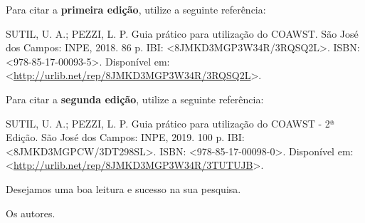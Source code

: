 \noindent Para citar a \textbf{primeira edição}, utilize a seguinte referência:
\bigskip

\noindent SUTIL, U. A.; PEZZI, L. P. Guia prático para utilização do COAWST. São José dos Campos: INPE, 2018. 86 p. IBI: <8JMKD3MGP3W34R/3RQSQ2L>. ISBN: <978-85-17-00093-5>. Disponível em: <\textcolor{bleu_cite}{\href{http://urlib.net/rep/8JMKD3MGP3W34R/3RQSQ2L}{http://urlib.net/rep/8JMKD3MGP3W34R/3RQSQ2L}}>. 
\bigskip

\noindent Para citar a \textbf{segunda edição}, utilize a seguinte referência:
\bigskip

\noindent SUTIL, U. A.; PEZZI, L. P. Guia prático para utilização do COAWST - 2ª Edição. São José dos Campos: INPE, 2019. 100 p. IBI: <8JMKD3MGPCW/3DT298SL>. ISBN: <978-85-17-00098-0>. Disponível em: <\textcolor{bleu_cite}{\href{http://urlib.net/rep/8JMKD3MGP3W34R/3TUTUJB}{http://urlib.net/rep/8JMKD3MGP3W34R/3TUTUJB}}>. 

\bigskip
\bigskip

\noindent Desejamos uma boa leitura e sucesso na sua pesquisa.
\begin{flushright}
\noindent Os autores.
\end{flushright}
\bigskip
